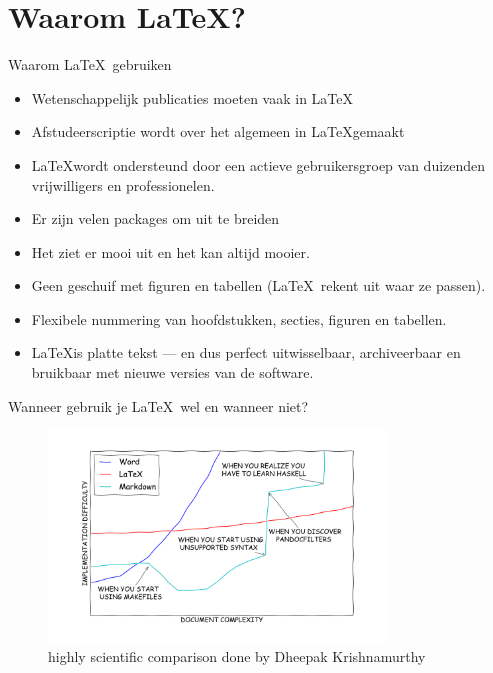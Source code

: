 \documentclass[aspectratio=169]{beamer}
\begin{document}
\section{Waarom \LaTeX?}

\begin{frame}[fragile]{Waarom \LaTeX\ gebruiken}

\begin{itemize}
\item Wetenschappelijk publicaties moeten vaak in \LaTeX
\item Afstudeerscriptie wordt over het algemeen in \LaTeX gemaakt
\item \LaTeX wordt ondersteund door een actieve gebruikersgroep van duizenden vrijwilligers en professionelen.
\item Er zijn velen packages om uit te breiden
\item Het ziet er mooi uit en het kan altijd mooier.
\item Geen geschuif met figuren en tabellen (\LaTeX\ rekent uit waar ze passen).
\item Flexibele nummering van hoofdstukken, secties, figuren en tabellen.
\item \LaTeX is platte tekst — en dus perfect uitwisselbaar, archiveerbaar en bruikbaar met nieuwe versies van de software.
\end{itemize}
\end{frame}

\begin{frame}[fragile]{Wanneer gebruik je \LaTeX\ wel en wanneer niet?}

\begin{figure}
\centering
\includegraphics[width=0.8\textwidth]{images/learningcurve.png}
\caption{highly scientific comparison done by Dheepak Krishnamurthy}
\end{figure}

\end{frame}
\end{document}
